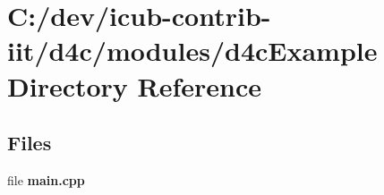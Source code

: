 \section{C\+:/dev/icub-\/contrib-\/iit/d4c/modules/d4c\+Example Directory Reference}
\label{dir_adae1137afda38b4ce421daebc84375a}
\subsection*{Files}
\begin{DoxyCompactItemize}
\item 
file {\bfseries main.\+cpp}
\end{DoxyCompactItemize}
